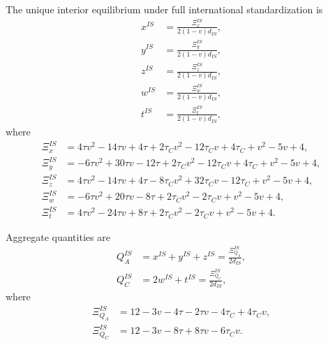\begin{lemma}
The unique interior equilibrium under full international standardization is
\begin{align}
x^{IS} &= \frac{\Xi_x^{IS}}{2(1-v)d_{IS}}, \label{eq:xis_main}\\
y^{IS} &= \frac{\Xi_y^{IS}}{2(1-v)d_{IS}}, \label{eq:yis_main}\\
z^{IS} &= \frac{\Xi_z^{IS}}{2(1-v)d_{IS}}, \label{eq:zis_main}\\
w^{IS} &= \frac{\Xi_w^{IS}}{2(1-v)d_{IS}}, \label{eq:wis_main}\\
t^{IS} &= \frac{\Xi_t^{IS}}{2(1-v)d_{IS}}, \label{eq:tis_main}
\end{align}
where
\begin{align}
\Xi_x^{IS}
&= 4\tau v^2-14\tau v+4\tau
+2\tau_C v^2-12\tau_C v+4\tau_C
+v^2-5v+4, \label{eq:Xix_is_main}\\
\Xi_y^{IS}
&= -6\tau v^2+30\tau v-12\tau
+2\tau_C v^2-12\tau_C v+4\tau_C
+v^2-5v+4, \label{eq:Xiy_is_main}\\
\Xi_z^{IS}
&= 4\tau v^2-14\tau v+4\tau
-8\tau_C v^2+32\tau_C v-12\tau_C
+v^2-5v+4, \label{eq:Xiz_is_main}\\
\Xi_w^{IS}
&= -6\tau v^2+20\tau v-8\tau
+2\tau_C v^2-2\tau_C v
+v^2-5v+4, \label{eq:Xiw_is_main}\\
\Xi_t^{IS}
&= 4\tau v^2-24\tau v+8\tau
+2\tau_C v^2-2\tau_C v
+v^2-5v+4. \label{eq:Xit_is_main}
\end{align}
\end{lemma}

\noindent
Aggregate quantities are
\begin{align}
Q_A^{IS}
&= x^{IS}+y^{IS}+z^{IS}
= \frac{\Xi_{Q_A}^{IS}}{2d_{IS}}, \label{eq:QAis_main}\\
Q_C^{IS}
&= 2w^{IS}+t^{IS}
= \frac{\Xi_{Q_C}^{IS}}{2d_{IS}}, \label{eq:QCis_main}
\end{align}
where
\begin{align}
\Xi_{Q_A}^{IS}
&= 12-3v-4\tau-2\tau v-4\tau_C+4\tau_C v, \label{eq:XiQA_is_main}\\
\Xi_{Q_C}^{IS}
&= 12-3v-8\tau+8\tau v-6\tau_C v. \label{eq:XiQC_is_main}
\end{align}

